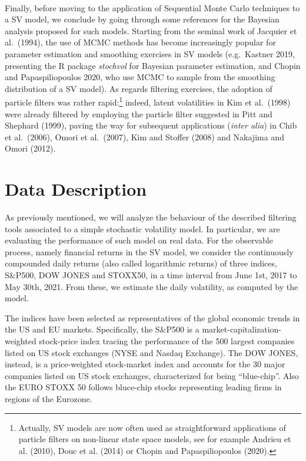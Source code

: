 \documentclass[
]{book}
\theoremstyle{break}
\theoremstyle{nonumberplain}
\begin{document}
~\\
Finally, before moving to the application of Sequential Monte Carlo
techniques to a SV model, we conclude by going through some references
for the Bayesian analysis proposed for such models. Starting from the
seminal work of Jacquier et al.~(1994), the use of MCMC methods has
become increasingly popular for parameter estimation and smoothing
exercises in SV models (e.g.~Kastner 2019, presenting the R package
\textit{stochvol} for Bayesian parameter estimation, and Chopin and
Papaspiliopoulos 2020, who use MCMC to sample from the smoothing
distribution of a SV model). As regards filtering exercises, the
adoption of particle filters was rather
rapid:\footnote{Actually, SV models are now often used as straightforward applications of particle filters on non-linear state space models, see for example Andrieu et al. (2010), Douc et al. (2014) or Chopin and Papaspiliopoulos (2020).}
indeed, latent volatilities in Kim et al.~(1998) were already filtered
by employing the particle filter suggested in Pitt and Shephard (1999),
paving the way for subsequent applications (\textit{inter alia}) in Chib
et al.~(2006), Omori et al.~(2007), Kim and Stoffer (2008) and Nakajima
and Omori (2012).\\

\section{Data Description}

As previously mentioned, we will analyze the behaviour of the described
filtering tools associated to a simple stochastic volatility model. In
particular, we are evaluating the performance of such model on real
data. For the observable process, namely financial returns in the SV
model, we consider the continuously compounded daily returns (also
called logarithmic returns) of three indices, S\&P500, DOW JONES and
STOXX50, in a time interval from June 1st, 2017 to May 30th, 2021. From
these, we estimate the daily volatility, as computed by the model.

The indices have been selected as representatives of the global economic
trends in the US and EU markets. Specifically, the S\&P500 is a
market-capitalization-weighted stock-price index tracing the performance
of the 500 largest companies listed on US stock exchanges (NYSE and
Nasdaq Exchange). The DOW JONES, instead, is a price-weighted
stock-market index and accounts for the 30 major companies listed on US
stock exchanges, characterized for being ``blue-chip''. Also the EURO
STOXX 50 follows bluce-chip stocks representing leading firms in regions
of the Eurozone.\\
\end{document}
